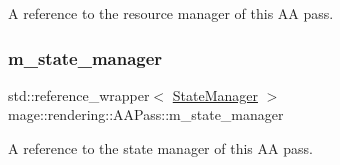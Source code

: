A reference to the resource manager of this AA pass. \hypertarget{classmage_1_1rendering_1_1_a_a_pass_a7fea13d1b4462ef4b9b1f6d82ce5aac4}{}\label{classmage_1_1rendering_1_1_a_a_pass_a7fea13d1b4462ef4b9b1f6d82ce5aac4} 
\subsubsection{\texorpdfstring{m\+\_\+state\+\_\+manager}{m\_state\_manager}}
{\footnotesize\ttfamily std\+::reference\+\_\+wrapper$<$ \hyperlink{classmage_1_1rendering_1_1_state_manager}{State\+Manager} $>$ mage\+::rendering\+::\+A\+A\+Pass\+::m\+\_\+state\+\_\+manager\hspace{0.3cm}{\ttfamily [private]}}

A reference to the state manager of this AA pass. 